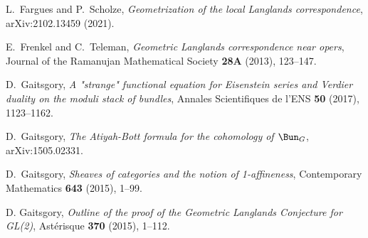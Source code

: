 \documentclass[9pt]{amsart}
\theoremstyle{remark}
\theoremstyle{definition}
\theoremstyle{remark}
\numberwithin{equation}{section}
\begin{document}
\begin{thebibliography}{99}





 L.~Fargues and P.~Scholze, 
{\it Geometrization of the local Langlands correspondence}, arXiv:2102.13459 (2021).

 E.~Frenkel and C.~Teleman, 
{\it Geometric Langlands correspondence near opers}, 
Journal of the Ramanujan Mathematical Society {\bf 28A} (2013), 123–147.

 D.~Gaitsgory, {\it A "strange" functional equation for Eisenstein series and Verdier
duality on the moduli stack of bundles}, Annales Scientifiques de l'ENS {\bf 50} (2017), 1123--1162. 


%

 D.~Gaitsgory, {\it The Atiyah-Bott formula for the cohomology of $\Bun_G$}, arXiv:1505.02331. 

 D.~Gaitsgory, {\it Sheaves of categories and the notion of 1-affineness}, 
Contemporary Mathematics {\bf 643}  (2015), 1--99.

 D. Gaitsgory, {\it Outline of the proof of the Geometric Langlands Conjecture for GL(2)}, Ast\'erisque {\bf 370} (2015),
1--112.


\end{thebibliography}
\end{document}
